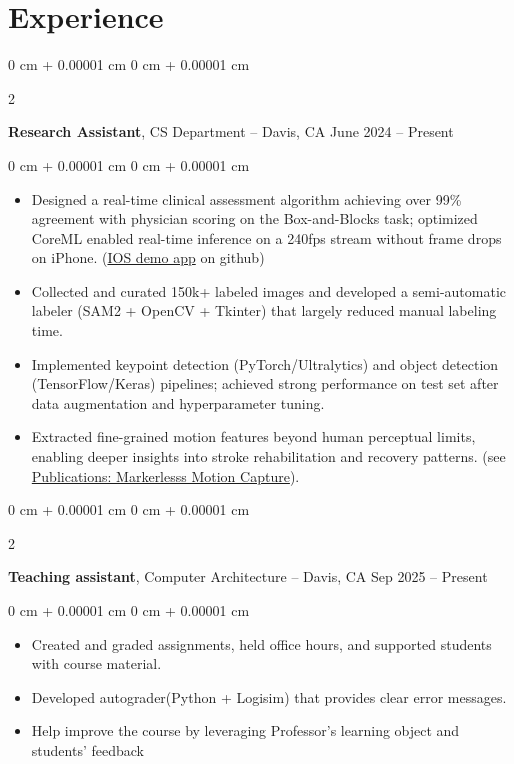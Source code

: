 \documentclass[10pt, letterpaper]{article}
\newenvironment{highlights}{
    \begin{itemize}[
        topsep=0.10 cm,
        parsep=0.10 cm,
        partopsep=0pt,
        itemsep=0pt,
        leftmargin=0 cm + 10pt
    ]
}{
    \end{itemize}
} %
\newenvironment{onecolentry}{
    \begin{adjustwidth}{
        0 cm + 0.00001 cm
    }{
        0 cm + 0.00001 cm
    }
}{
    \end{adjustwidth}
} %
\newenvironment{twocolentry}[2][]{
    \onecolentry
    \def\secondColumn{#2}
    \setcolumnwidth{\fill, 6 cm}
    \begin{paracol}{2}
}{
    \switchcolumn \raggedleft \secondColumn
    \end{paracol}
    \endonecolentry
} %
\begin{document}
    
    \section{Experience}



        
        \begin{twocolentry}{
            June 2024 – Present
        }
            \textbf{Research Assistant}, CS Department -- Davis, CA\end{twocolentry}

        \vspace{0.10 cm}
        \begin{onecolentry}
            \begin{highlights}
                \item Designed a real-time clinical assessment algorithm achieving over 99\% agreement with physician scoring on the Box-and-Blocks task; optimized CoreML enabled real-time inference on a 240fps stream without frame drops on iPhone. (\href{https://github.com/AlundorZhu/CMORE-app}{IOS demo app} on github)
                \item Collected and curated 150k+ labeled images and developed a semi-automatic labeler (SAM2 + OpenCV + Tkinter) that largely reduced manual labeling time.
                \item Implemented keypoint detection (PyTorch/Ultralytics) and object detection (TensorFlow/Keras) pipelines; achieved strong performance on test set after data augmentation and hyperparameter tuning.
                \item Extracted fine-grained motion features beyond human perceptual limits, enabling deeper insights into stroke rehabilitation and recovery patterns. (see \hyperref[pub:markerless-motion-capture]{Publications: Markerlesss Motion Capture}). 
            \end{highlights}
        \end{onecolentry}

        \vspace{0.2 cm}

        \begin{twocolentry}{
            Sep 2025 – Present
        }
            \textbf{Teaching assistant}, Computer Architecture -- Davis, CA\end{twocolentry}

        \vspace{0.10 cm}
        \begin{onecolentry}
            \begin{highlights}
                \item Created and graded assignments, held office hours, and supported students with course material.
                \item Developed autograder(Python + Logisim) that provides clear error messages.
                \item Help improve the course by leveraging Professor's learning object and students' feedback

            \end{highlights}
        \end{onecolentry}
\end{document}
